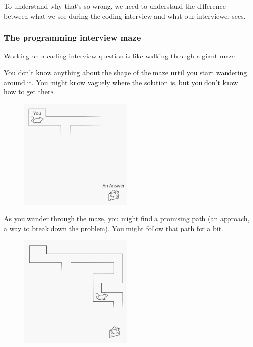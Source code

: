 \documentclass{article}
\begin{document}
To understand why that's so wrong, we need to understand the difference between what we see during the coding interview and what our interviewer sees.


\subsubsection{The programming interview maze}

Working on a coding interview question is like walking through a giant maze.

You don't know anything about the shape of the maze until you start wandering around it. You might know vaguely where the solution is, but you don't know how to get there. 

\begin{figure}[H]
  \centering
  \includegraphics[width=0.5\textwidth]{pics/maze1}
  \label{fig:maze1}
\end{figure}



As you wander through the maze, you might find a promising path (an approach, a way to break down the problem). You might follow that path for a bit. 


\begin{figure}[H]
  \centering
  \includegraphics[width=0.5\textwidth]{pics/maze2}
  \label{fig:maze2}
\end{figure}
\end{document}
